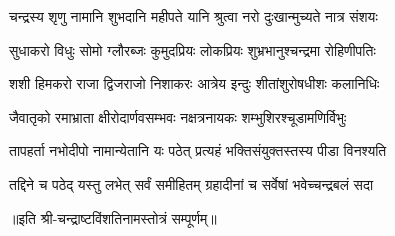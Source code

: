 

\twolineshloka
{चन्द्रस्य शृणु नामानि शुभदानि महीपते}
{यानि श्रुत्वा नरो दुःखान्मुच्यते नात्र संशयः}

\twolineshloka
{सुधाकरो विधुः सोमो ग्लौरब्जः कुमुदप्रियः}
{लोकप्रियः शुभ्रभानुश्चन्द्रमा रोहिणीपतिः}

\twolineshloka
{शशी हिमकरो राजा द्विजराजो निशाकरः}
{आत्रेय इन्दुः शीतांशुरोषधीशः कलानिधिः}

\twolineshloka
{जैवातृको रमाभ्राता क्षीरोदार्णवसम्भवः}
{नक्षत्रनायकः शम्भुशिरश्चूडामणिर्विभुः}

\twolineshloka
{तापहर्ता नभोदीपो नामान्येतानि यः पठेत्}
{प्रत्यहं भक्तिसंयुक्तस्तस्य पीडा विनश्यति}

\twolineshloka
{तद्दिने च पठेद् यस्तु लभेत् सर्वं समीहितम्}
{ग्रहादीनां च सर्वेषां भवेच्चन्द्रबलं सदा}


॥इति श्री-चन्द्राष्टविंशतिनामस्तोत्रं सम्पूर्णम्॥